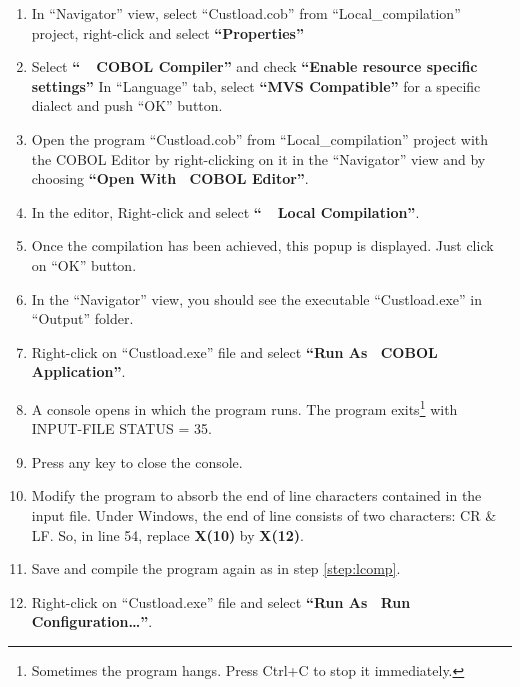 \begin{enumerate}
\item In ``Navigator'' view, select ``Custload.cob'' from ``Local\_compilation'' project, right-click and select \textbf{``Properties''}

\item Select \textbf{``\mxproduct~\RHD~COBOL Compiler''} and check \textbf{``Enable resource specific settings''}
In ``Language'' tab, select \textbf{``MVS Compatible''} for a specific dialect and push ``OK'' button.

\item Open the program ``Custload.cob'' from ``Local\_compilation'' project with the COBOL Editor by right-clicking on it in the ``Navigator'' view and by choosing \textbf{``Open With \RHD~COBOL Editor''}.

\item\label{step:lcomp} In the editor, Right-click and select \textbf{``\mxproduct~\RHD~Local Compilation''}.

\item Once the compilation has been achieved, this popup is displayed.
Just click on ``OK'' button.

\item In the ``Navigator'' view, you should see the executable ``Custload.exe'' in ``Output'' folder.

\item Right-click on ``Custload.exe'' file and select \textbf{``Run As \RHD~COBOL Application''}.

\item A console opens in which the program runs.
The program exits\footnote{ Sometimes the program hangs. Press Ctrl+C to stop it immediately.} with INPUT-FILE STATUS = 35.

\item Press any key to close the console.

\item Modify the program to absorb the end of line characters contained in the input file. Under Windows, the end of line consists of two characters: CR \& LF. So, in line 54, replace \textbf{X(10)} by \textbf{X(12)}.

\item Save and compile the program again as in step \ref{step:lcomp}.

\item Right-click on ``Custload.exe'' file and select \textbf{``Run As \RHD~Run Configuration\dots ''}.


\end{enumerate}
